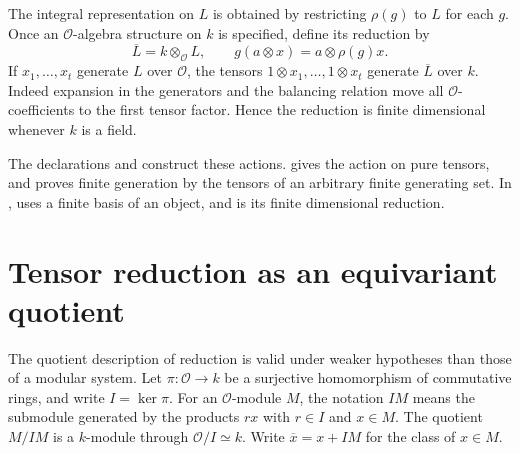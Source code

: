 The integral representation on $L$ is obtained by restricting $\rho(g)$
to $L$ for each $g$. Once an $\mathcal O$-algebra structure on $k$ is
specified, define its reduction by
\[
 \overline L=k\otimes_{\mathcal O}L,
 \qquad
 g(a\otimes x)=a\otimes\rho(g)x.
\]
If $x_1,\ldots,x_t$ generate $L$ over $\mathcal O$, the tensors
$1\otimes x_1,\ldots,1\otimes x_t$ generate $\overline L$ over $k$.
Indeed expansion in the generators and the balancing relation move all
$\mathcal O$-coefficients to the first tensor factor. Hence the reduction
is finite dimensional whenever $k$ is a field.

\begin{implementation}
The declarations  and
 construct these actions.
 gives the action on pure tensors, and
 proves finite generation by the tensors of
an arbitrary finite generating set. In
, 
uses a finite basis of an  object, and
 is its finite dimensional reduction.
\end{implementation}

\section{Tensor reduction as an equivariant quotient}
\label{lib:reduction:quotient}

The quotient description of reduction is valid under weaker hypotheses
than those of a modular system. Let $\pi:\mathcal O\to k$ be a
surjective homomorphism of commutative rings, and write $I=\ker\pi$.
For an $\mathcal O$-module $M$, the notation $IM$ means the submodule
generated by the products $rx$ with $r\in I$ and $x\in M$.
The quotient $M/IM$ is a $k$-module through
$\mathcal O/I\simeq k$. Write $\overline x=x+IM$ for the class of $x\in M$.

